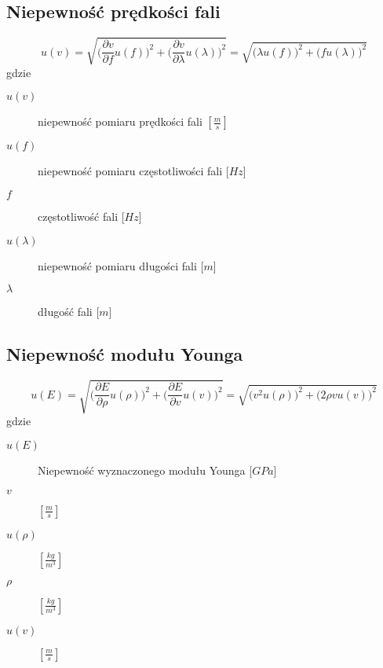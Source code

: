 \documentclass[a4paper,11pt]{article}
\begin{document}
	\subsection{Niepewność prędkości fali}
	$$ u(v)=\sqrt{\bigg(\frac{\partial v}{\partial f}u(f)\bigg)^2+\bigg(\frac{\partial v}{\partial \lambda}u(\lambda)\bigg)^2}=\sqrt{\bigg(\lambda u(f)\bigg)^2+\bigg(f u(\lambda)\bigg)^2}$$
	gdzie 
    \begin{description}
    \item [$u(v)$] niepewność pomiaru prędkości fali $\left[\frac{m}{s}\right]$
    \item [$u(f)$] niepewność pomiaru częstotliwości fali [$Hz$]
    \item [$f$] częstotliwość fali [$Hz$]
     \item [$u(\lambda)$] niepewność pomiaru długości fali [$m$]
     \item [$\lambda$] długość fali [$m$]
    \end{description}
    
	\subsection{Niepewność modułu Younga}
	$$ u(E)=\sqrt{\bigg(\frac{\partial E}{\partial \rho}u(\rho)\bigg)^2+\bigg(\frac{\partial E}{\partial v}u(v)\bigg)^2} =
	\sqrt{\bigg(v^2 u(\rho)\bigg)^2+\bigg(2 \rho v u(v)\bigg)^2}$$
	gdzie
    \begin{description}
    \item [$u(E)$] Niepewność wyznaczonego modułu Younga [$GPa$]
    
    \item [$v$] $\left[\frac{m}{s}\right]$
    
    \item [$u(\rho)$] $\left[\frac{kg}{m^3}\right]$
    
    \item [$\rho$] $\left[\frac{kg}{m^3}\right]$
    \item [$u(v)$] $\left[\frac{m}{s}\right]$
    \end{description}
    
\end{document}
